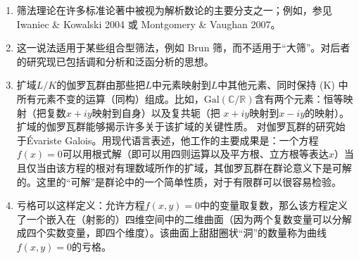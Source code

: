 \begin{enumerate}
\item 筛法理论在许多标准论著中被视为解析数论的主要分支之一；例如，参见 Iwaniec & Kowalski 2004 或 Montgomery & Vaughan 2007。
\item 这一说法适用于某些组合型筛法，例如 Brun 筛，而不适用于“大筛”。对后者的研究现已包括调和分析和泛函分析的思想。
\item 扩域$L/K$的伽罗瓦群由那些把$L$中元素映射到$L$中其他元素、同时保持 (K) 中所有元素不变的运算（同构）组成。比如，$\mathrm{Gal}(\mathbb{C}/\mathbb{R})$含有两个元素：恒等映射（把复数$x+iy$映射到自身）以及复共轭（把 $x+iy$映射到$x-iy$的映射）。扩域的伽罗瓦群能够揭示许多关于该扩域的关键性质。
对伽罗瓦群的研究始于Évariste Galois。用现代语言表述，他工作的主要成果是：一个方程$f(x) = 0$可以用根式解（即可以用四则运算以及平方根、立方根等表达$x$）当且仅当由该方程的根对有理数域所作的扩域，其伽罗瓦群在群论意义下是可解的。这里的“可解”是群论中的一个简单性质，对于有限群可以很容易检验。
\item 亏格可以这样定义：允许方程$f(x,y) = 0$中的变量取复数，那么该方程定义了一个嵌入在（射影的）四维空间中的二维曲面（因为两个复数变量可以分解成四个实数变量，即四个维度）。该曲面上甜甜圈状“洞”的数量称为曲线$f(x,y) = 0$的亏格。
\end{enumerate}
